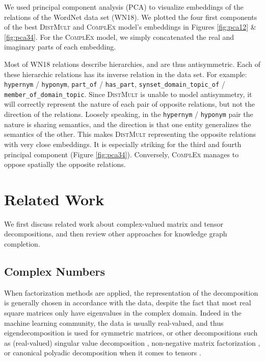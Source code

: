 \documentclass[twoside,11pt]{article}
\renewcommand{\cite}{\citep}
\begin{document}
We used principal component analysis (PCA) to visualize embeddings of the relations 
of the WordNet data set (WN18). We plotted the four first components of the best \textsc{DistMult}
and \textsc{ComplEx} model's embeddings in Figures \ref{fig:pca12} \& \ref{fig:pca34}. For the \textsc{ComplEx} model, we simply concatenated
the real and imaginary parts of each embedding. 

Most of WN18 relations describe hierarchies, and are thus antisymmetric.
Each of these hierarchic relations has its inverse relation in the data set. For example: \texttt{hypernym} / \texttt{hyponym},
\texttt{part\_of} / \texttt{has\_part}, \texttt{synset\_domain\_topic\_of} / \texttt{member\_of\_domain\_topic}.
Since \textsc{DistMult} is unable to model antisymmetry, it will correctly represent the nature
of each pair of opposite relations, but not the direction of the relations.
Loosely speaking, in the \texttt{hypernym} / \texttt{hyponym} pair the nature is 
sharing semantics,
and the direction is that one entity generalizes the semantics of the other. 
This makes \textsc{DistMult} representing the opposite relations with very close embeddings.
It is especially striking for the third and
fourth principal component (Figure \ref{fig:pca34}). Conversely, \textsc{ComplEx} manages to oppose spatially
the opposite relations.






\section{Related Work}
\label{sec:rel_work}
We first discuss related work about complex-valued matrix and tensor decompositions,
and then review other approaches for knowledge graph completion.

\subsection{Complex Numbers}

When factorization methods are applied, the representation of the decomposition
is generally chosen in
accordance with the data, despite the fact that most real square 
matrices only have eigenvalues in the complex domain.
Indeed in the machine learning community, the data is usually real-valued,
and thus eigendecomposition is used for symmetric matrices, or other
decompositions such as (real-valued) singular value decomposition \cite{beltrami1873sulle}, 
non-negative matrix factorization \cite{paatero1994positive}, or canonical polyadic
decomposition when it comes to tensors \cite{hitchcock-sum-1927}.
\end{document}
